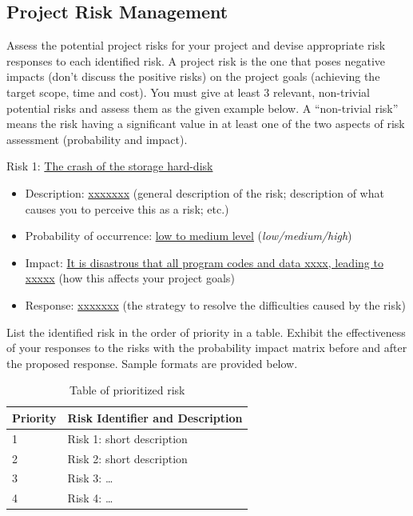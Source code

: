 \documentclass[11pt,a4paper]{article}
\begin{document}
\subsection{Project Risk Management}

Assess the potential project risks for your project and devise appropriate risk responses to each identified risk. A project risk is the one that poses negative impacts (don't discuss the positive risks) on the project goals (achieving the target scope, time and cost). You must give at least 3 relevant, non-trivial potential risks and assess them as the given example below. A ``non-trivial risk'' means the risk having a significant value in at least one of the two aspects of risk assessment (probability and impact).

Risk 1: \underline{The crash of the storage hard-disk}
\begin{itemize}[leftmargin=0.85cm, labelindent=0cm]
  \item Description: \underline{xxxxxxx} (general description of the risk; description of what causes you to perceive this as a risk; etc.)
  \item Probability of occurrence: \underline{low to medium level} (\textit{low/medium/high})
  \item Impact: \underline{It is disastrous that all program codes and data xxxx, leading to xxxxx} (how this affects your project goals)
  \item Response: \underline{xxxxxxx} (the strategy to resolve the difficulties caused by the risk)
\end{itemize}

List the identified risk in the order of priority in a table. Exhibit the effectiveness of your responses to the risks with the probability impact matrix before and after the proposed response. Sample formats are provided below.

\begin{table}[htbp]
\centering
\begin{tabular}{|m{2cm}|p{12.5cm}|}
\hline
\rule{0pt}{14pt}Priority & Risk Identifier and Description \\ \hline
\rule{0pt}{14pt}1 & Risk 1: short description \\ \hline
\rule{0pt}{14pt}2 & Risk 2: short description \\ \hline
\rule{0pt}{14pt}3 & Risk 3: \ldots \\ \hline
\rule{0pt}{14pt}4 & Risk 4: \ldots \\ \hline
\end{tabular}
\caption{Table of prioritized risk}
\label{tab:risk}
\end{table}
\end{document}
